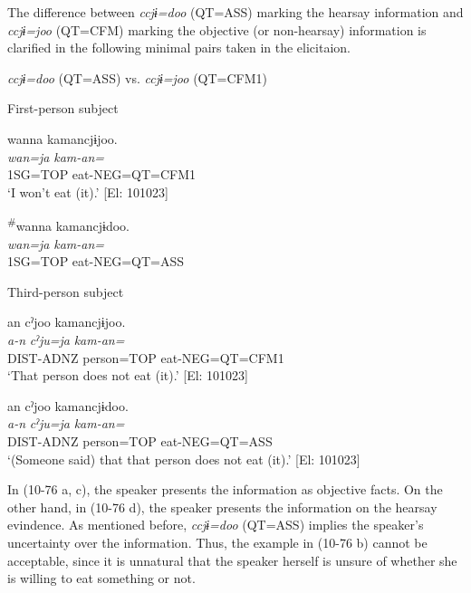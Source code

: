   The difference between \textit{ccjɨ=doo} (QT=ASS) marking the hearsay information and \textit{ccjɨ=joo} (QT=CFM) marking the objective (or non-hearsay) information is clarified in the following minimal pairs taken in the elicitaion.

\ea\label{ex:10.76}   \textit{ccjɨ=doo} (QT=ASS) vs. \textit{ccjɨ=joo} (QT=CFM1)\\
  \begin{xlist}
  \exi{} First-person subject

  \ex  %
      \glll    wanna  kamancjɨjoo.  \\
      \textit{wan=ja}  \textit{kam-an=}  \\
      1SG=TOP  eat-NEG=QT=CFM1  \\
      \glt       ‘I won’t eat (it).’ [El: 101023]

  \ex  %
      \glll    \textsuperscript{\#}wanna  kamancjɨdoo.\\
      \textit{wan=ja}  \textit{kam-an=}\\
      1SG=TOP  eat-NEG=QT=ASS\\
      \glt [El: 101023]

  \exi{} Third-person subject

  \ex  %
      \glll     an  cˀjoo  kamancjɨjoo.\\
      \textit{a-n}  \textit{cˀju=ja}  \textit{kam-an=}\\
      DIST-ADNZ  person=TOP  eat-NEG=QT=CFM1\\
      \glt        ‘That person does not eat (it).’ [El: 101023]

  \ex  %
      \glll     an  cˀjoo  kamancjɨdoo.\\
      \textit{a-n}  \textit{cˀju=ja}  \textit{kam-an=}\\
      DIST-ADNZ  person=TOP  eat-NEG=QT=ASS\\
      \glt        ‘(Someone said) that that person does not eat (it).’ [El: 101023]
    \end{xlist}
\z

In (10-76 a, c), the speaker presents the information as objective facts. On the other hand, in (10-76 d), the speaker presents the information on the hearsay evindence. As mentioned before, \textit{ccjɨ=doo} (QT=ASS) implies the speaker’s uncertainty over the information. Thus, the example in (10-76 b) cannot be acceptable, since it is unnatural that the speaker herself is unsure of whether she is willing to eat something or not.

